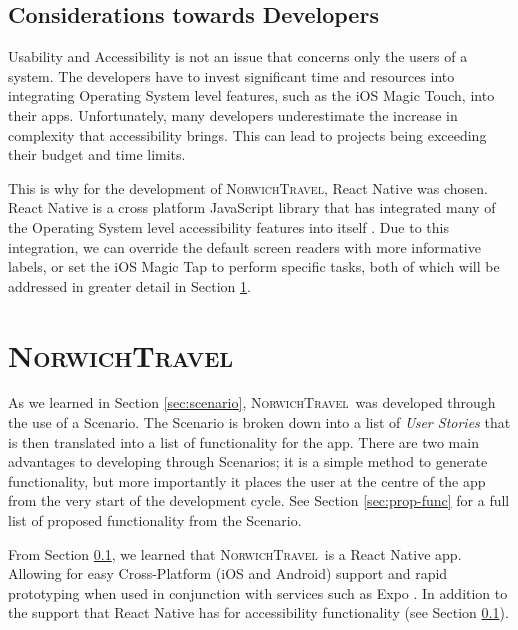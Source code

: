 \documentclass[cmpstyle]{ueacmpstyle}
\newcommand{\nt}{\textsc{NorwichTravel}}
\begin{document}
		\subsection{Considerations towards Developers} \label{sec:devcons}
		Usability and Accessibility is not an issue that concerns only the users of a system. The developers have to invest significant time and resources into integrating Operating System level features, such as the iOS Magic Touch, into their apps. Unfortunately, many developers underestimate the increase in complexity that accessibility brings. This can lead to projects being exceeding their budget and time limits.
		
		This is why for the development of \nt, React Native was chosen. React Native is a cross platform JavaScript library that has integrated many of the Operating System level accessibility features into itself \citep{reactAccess}. Due to this integration, we can override the default screen readers with more informative labels, or set the iOS Magic Tap to perform specific tasks, both of which will be addressed in greater detail in Section \ref{sec:nortrav}.
		
	\section{\nt} \label{sec:nortrav}
	As we learned in Section \ref{sec:scenario}, \nt \ was developed through the use of a Scenario. The Scenario is broken down into a list of \textit{User Stories} that is then translated into a list of functionality for the app. There are two main advantages to developing through Scenarios; it is a simple method to generate functionality, but more importantly it places the user at the centre of the app from the very start of the development cycle. See Section \ref{sec:prop-func} for a full list of proposed functionality from the Scenario.
	
	From Section \ref{sec:devcons}, we learned that \nt \ is a React Native app. Allowing for easy Cross-Platform (iOS and Android) support and rapid prototyping when used in conjunction with services such as Expo \citep{expo}. In addition to the support that React Native has for accessibility functionality (see Section \ref{sec:devcons}).
	
\end{document}
